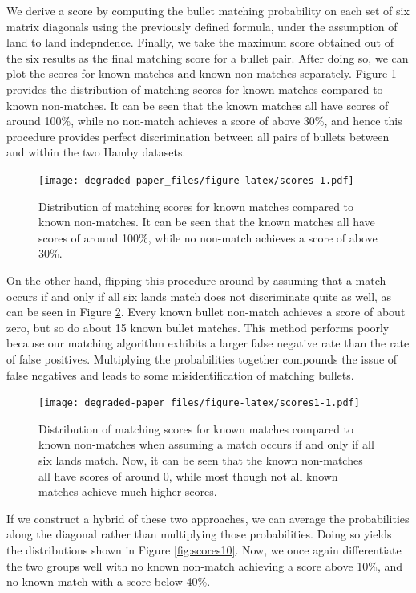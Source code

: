 \documentclass[12pt,]{article}
\theoremstyle{definition}
\theoremstyle{definition}
\theoremstyle{definition}
\theoremstyle{remark}
\begin{document}
We derive a score by computing the bullet matching probability on each
set of six matrix diagonals using the previously defined formula, under
the assumption of land to land indepndence. Finally, we take the maximum
score obtained out of the six results as the final matching score for a
bullet pair. After doing so, we can plot the scores for known matches
and known non-matches separately. Figure \ref{fig:scores} provides the
distribution of matching scores for known matches compared to known
non-matches. It can be seen that the known matches all have scores of
around 100\%, while no non-match achieves a score of above 30\%, and
hence this procedure provides perfect discrimination between all pairs
of bullets between and within the two Hamby datasets.

\begin{figure}[htbp]
\centering
\texttt{[image: degraded-paper\_files/figure-latex/scores-1.pdf]}
\caption{\label{fig:scores}Distribution of matching scores for known matches
compared to known non-matches. It can be seen that the known matches all
have scores of around 100\%, while no non-match achieves a score of
above 30\%.}
\end{figure}

On the other hand, flipping this procedure around by assuming that a
match occurs if and only if all six lands match does not discriminate
quite as well, as can be seen in Figure \ref{fig:scores1}. Every known
bullet non-match achieves a score of about zero, but so do about 15
known bullet matches. This method performs poorly because our matching
algorithm exhibits a larger false negative rate than the rate of false
positives. Multiplying the probabilities together compounds the issue of
false negatives and leads to some misidentification of matching bullets.

\begin{figure}[htbp]
\centering
\texttt{[image: degraded-paper\_files/figure-latex/scores1-1.pdf]}
\caption{\label{fig:scores1}Distribution of matching scores for known
matches compared to known non-matches when assuming a match occurs if
and only if all six lands match. Now, it can be seen that the known
non-matches all have scores of around 0, while most though not all known
matches achieve much higher scores.}
\end{figure}

If we construct a hybrid of these two approaches, we can average the
probabilities along the diagonal rather than multiplying those
probabilities. Doing so yields the distributions shown in Figure
\ref{fig:scores10}. Now, we once again differentiate the two groups well
with no known non-match achieving a score above 10\%, and no known match
with a score below 40\%.
\end{document}
